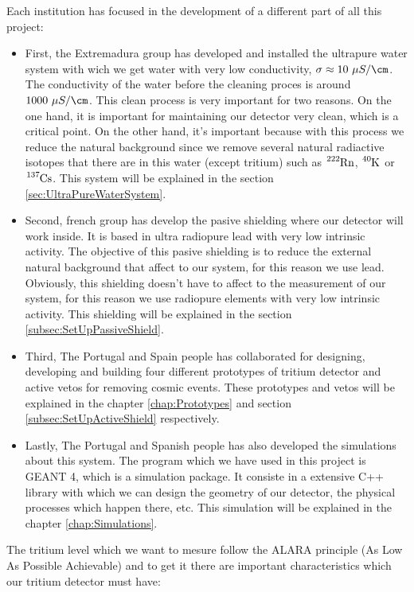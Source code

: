 Each institution has focused in the development of a different part of all this project:
\begin{itemize}
\item{} First, the Extremadura group has developed and installed the ultrapure water system with wich we get water with very low conductivity, $\sigma \approx 10 ~\mu S / \cm$. The conductivity of the water before the cleaning proces is around $ 1000 ~\mu S / \cm$. This clean process is very important for two reasons. On the one hand, it is important for maintaining our detector very clean, which is a critical point. On the other hand, it's important because with this process we reduce the natural background since we remove several natural radiactive isotopes that there are in this water (except tritium) such as $\ce{^{222}Rn}$, $\ce{^{40}K}$ or $\ce{^{137}Cs}$. This system will be explained in the section \ref{sec:UltraPureWaterSystem}.

\item{} Second, french group has develop the pasive shielding where our detector will work inside. It is based in ultra radiopure lead with very low intrinsic activity. The objective of this pasive shielding is to reduce the external natural background that affect to our system, for this reason we use lead. Obviously, this shielding doesn't have to affect to the measurement of our system, for this reason we use radiopure elements with very low intrinsic activity. This shielding will be explained in the section \ref{subsec:SetUpPassiveShield}.

\item{} Third, The Portugal and Spain people has collaborated for designing, developing and building four different prototypes of tritium detector and active vetos for removing cosmic events. These prototypes and vetos will be explained in the chapter \ref{chap:Prototypes} and section \ref{subsec:SetUpActiveShield} respectively.

\item{} Lastly, The Portugal and Spanish people has also developed the simulations about this system. The program which we have used in this project is GEANT 4, which is a simulation package. It consiste in a extensive C++ library with which we can design the geometry of our detector, the physical processes which happen there, etc. This simulation will be explained in the chapter \ref{chap:Simulations}.

\end{itemize}

The tritium level which we want to mesure follow the ALARA principle (As Low As Possible Achievable) and to get it there are important characteristics which our tritium detector must have:

